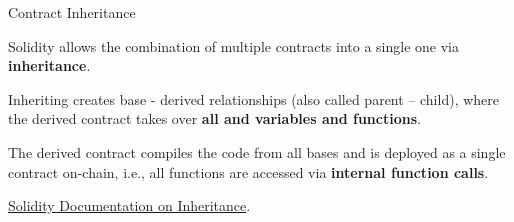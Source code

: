 \documentclass[]{beamer}
\begin{document}
\begin{frame}{Contract Inheritance}

\begin{minipage}{0.45\textwidth}
	\begin{figure}[t]
		\centering
		\begin{tikzpicture}[scale=0.9, every node/.style={scale=0.9}]
			
		\end{tikzpicture}
	\end{figure}
\end{minipage}
\begin{minipage}{0.5\textwidth}
	Solidity allows the combination of multiple contracts into a single one via \textbf{inheritance}.

	\vspace{0.5em}

	Inheriting creates base - derived relationships (also called parent – child), where the derived contract takes over \textbf{all  and  variables and functions}.	

\end{minipage}

\vspace{1em}

	The derived contract compiles the code from all bases and is deployed as a single contract on-chain, i.e.,  all functions are accessed via \textbf{internal function calls}. 

\vspace{1.5em}

\link \href{https://docs.soliditylang.org/en/latest/contracts.html}{Solidity Documentation on Inheritance}.

\end{frame}
\end{document}
